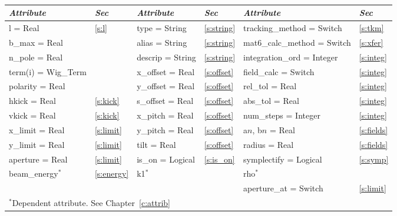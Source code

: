 {{\begin{center}
\tt
\begin{tabular}{|l|l||l|l||l|l|} \hline
  {\sl Attribute} & {\sl Sec}  & {\sl Attribute} & {\sl Sec} & {\sl Attribute} & {\sl Sec} \\ \hline
  l        = Real       & \ref{s:l}      & type = String      & \ref{s:string} & tracking\_method = Switch   & \ref{s:tkm}   \\ \hline
  b\_max   = Real       &                & alias = String     & \ref{s:string} & mat6\_calc\_method = Switch & \ref{s:xfer}  \\ \hline
  n\_pole  = Real       &                & descrip = String   & \ref{s:string} & integration\_ord = Integer  & \ref{s:integ} \\ \hline
  term(i) = Wig\_Term   &                & x\_offset  = Real  & \ref{s:offset} & field\_calc = Switch        & \ref{s:integ} \\ \hline
  polarity = Real       &                & y\_offset  = Real  & \ref{s:offset} & rel\_tol = Real             & \ref{s:integ} \\ \hline
  hkick    = Real       & \ref{s:kick}   & s\_offset  = Real  & \ref{s:offset} & abs\_tol = Real             & \ref{s:integ} \\ \hline
  vkick    = Real       & \ref{s:kick}   & x\_pitch = Real    & \ref{s:offset} & num\_steps = Integer        & \ref{s:integ} \\ \hline
  x\_limit = Real       & \ref{s:limit}  & y\_pitch = Real    & \ref{s:offset} & a$n$, b$n$ = Real           & \ref{s:fields}\\ \hline
  y\_limit = Real       & \ref{s:limit}  & tilt     = Real    & \ref{s:offset} & radius  = Real              & \ref{s:fields}\\ \hline
  aperture = Real       & \ref{s:limit}  & is\_on = Logical   & \ref{s:is_on}  & symplectify = Logical       & \ref{s:symp}  \\ \hline
  beam\_energy$^*$      & \ref{s:energy} & k1$^*$             &                & rho$^*$                     &               \\ \hline
                        &                &                    &                & aperture\_at = Switch       & \ref{s:limit} \\ \hline
  \multicolumn{6}{l}{\small $^*$Dependent attribute. See Chapter~\ref{c:attrib}} \\
\end{tabular}
\end{center}
\toffset

}}
